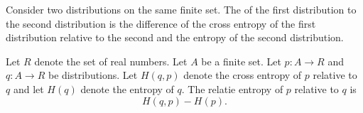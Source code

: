 
\sbasic


















\sstart
{}



Consider two distributions
on the same finite set.
The 
of the first distribution
 to the
second distribution
is the difference of
the cross entropy of the first
distribution relative to the second
and the entropy of the second distribution.


Let $R$ denote the set of
real numbers. Let
$A$ be a finite set.
Let $p: A \to R$ and
$q: A \to R$ be distributions.
Let $H(q, p)$ denote the
cross entropy of $p$ relative
to $q$ and let $H(q)$ denote
the entropy of $q$.
The relatie entropy of $p$ relative to $q$
is
\[
  H(q, p) - H(p).
\]
\strats
